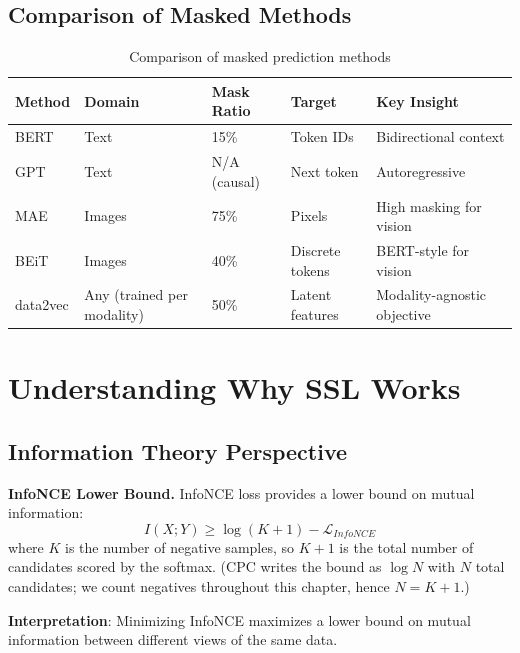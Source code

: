 \subsection{Comparison of Masked Methods}

\begin{table}[H]
\centering
\caption{Comparison of masked prediction methods}
\begin{tabularx}{\textwidth}{lXXXX}
\toprule
\textbf{Method} & \textbf{Domain} & \textbf{Mask Ratio} & \textbf{Target} & \textbf{Key Insight} \\
\midrule
BERT & Text & 15\% & Token IDs & Bidirectional context \\
GPT & Text & N/A (causal) & Next token & Autoregressive \\
MAE & Images & 75\% & Pixels & High masking for vision \\
BEiT & Images & 40\% & Discrete tokens & BERT-style for vision \\
data2vec & Any (trained per modality) & 50\% & Latent features & Modality-agnostic objective \\
\bottomrule
\end{tabularx}
\end{table}

\section{Understanding Why SSL Works}
\label{sec:ssl_theory}

\subsection{Information Theory Perspective}

\textbf{InfoNCE Lower Bound.} InfoNCE loss provides a lower bound on mutual information:
\begin{equation}
I(X; Y) \geq \log(K+1) - \mathcal{L}_{InfoNCE}
\end{equation}
where $K$ is the number of negative samples, so $K+1$ is the total number of candidates scored by the softmax. (CPC writes the bound as $\log N$ with $N$ total candidates; we count negatives throughout this chapter, hence $N = K+1$.)

\textbf{Interpretation}: Minimizing InfoNCE maximizes a lower bound on mutual information between different views of the same data.

